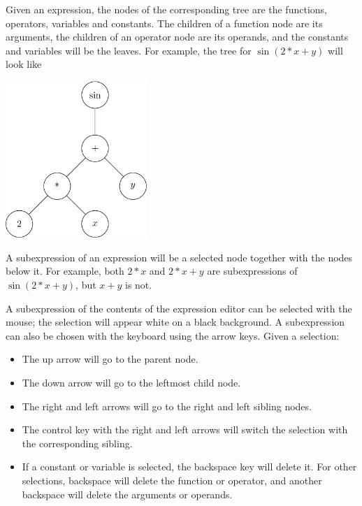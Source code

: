 \documentclass[a4paper,11pt]{book}
\begin{document}
Given an expression, the nodes of the corresponding
tree are the functions, operators, variables
and constants.  The children of a function node are its arguments, the
children of an operator node are its operands, and the constants and
variables will be the leaves.  For example, the tree for $\sin(2*x +
y)$ will look like
\begin{center}
  \includegraphics[width=0.4\textwidth]{expr-tree.png}
\end{center}
A subexpression of an expression will be a
selected node together with the nodes below it.  For example, both
$2*x$ and $2*x+y$ are subexpressions of $\sin(2*x+y)$, but $x+y$ is
not.

A subexpression of the contents of the expression editor can be
selected with the mouse; the selection will appear white on a black
background.  A subexpression can also be chosen with the keyboard
using the arrow keys.  Given a selection:
\begin{itemize}
  \item
  The up arrow will go to the parent node.
  \item
  The down arrow will go to the leftmost child node.
  \item
  The right and left arrows will go to the right and left sibling nodes.
  \item
  The control key with the right and left arrows will switch the
  selection with the corresponding sibling.
  \item
  If a constant or variable is selected, the backspace key will delete
  it.  For other selections, backspace will delete the function or
  operator, and another backspace will delete the arguments or operands.
\end{itemize}
\end{document}
